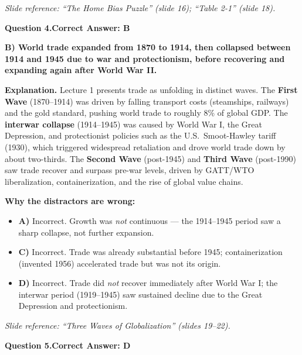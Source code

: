 \documentclass[11pt]{article}
\begin{document}
\textit{Slide reference: ``The Home Bias Puzzle'' (slide 16); ``Table 2-1'' (slide 18).}

\bigskip

\noindent\textbf{Question 4.}\quad\textbf{Correct Answer: B}

\begin{correctbox}
\textbf{B) World trade expanded from 1870 to 1914, then collapsed between 1914 and 1945 due to war and protectionism, before recovering and expanding again after World War II.}
\end{correctbox}

\medskip
\noindent\textbf{Explanation.}\enspace
Lecture 1 presents trade as unfolding in distinct waves. The \textbf{First Wave}
(1870--1914) was driven by falling transport costs (steamships, railways) and
the gold standard, pushing world trade to roughly 8\% of global GDP. The
\textbf{interwar collapse} (1914--1945) was caused by World War I, the Great
Depression, and protectionist policies such as the U.S.\ Smoot-Hawley tariff
(1930), which triggered widespread retaliation and drove world trade down by
about two-thirds. The \textbf{Second Wave} (post-1945) and \textbf{Third Wave}
(post-1990) saw trade recover and surpass pre-war levels, driven by GATT/WTO
liberalization, containerization, and the rise of global value chains.

\noindent\textbf{Why the distractors are wrong:}
\begin{itemize}[nosep,leftmargin=1.3em]
  \item \textbf{A)} Incorrect. Growth was \emph{not} continuous — the
        1914--1945 period saw a sharp collapse, not further expansion.
  \item \textbf{C)} Incorrect. Trade was already substantial before 1945;
        containerization (invented 1956) accelerated trade but was not its origin.
  \item \textbf{D)} Incorrect. Trade did \emph{not} recover immediately after
        World War I; the interwar period (1919--1945) saw sustained decline due
        to the Great Depression and protectionism.
\end{itemize}

\textit{Slide reference: ``Three Waves of Globalization'' (slides 19--22).}

\bigskip

\noindent\textbf{Question 5.}\quad\textbf{Correct Answer: D}
\end{document}
